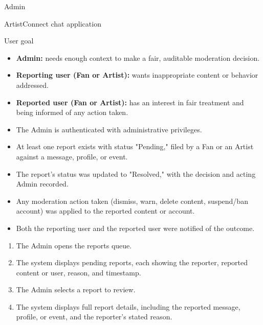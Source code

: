 \documentclass[11pt]{report}
\begin{document}
\begin{description}[leftmargin=2.2cm, style=nextline]
  \item[Primary Actor] Admin
  \item[Scope] ArtistConnect chat application
  \item[Level] User goal
  \item[Stakeholders \& Interests]
    \begin{itemize}
      \item \textbf{Admin:} needs enough context to make a fair, auditable moderation decision.
      \item \textbf{Reporting user (Fan or Artist):} wants inappropriate content or behavior addressed.
      \item \textbf{Reported user (Fan or Artist):} has an interest in fair treatment and being informed of any action taken.
    \end{itemize}
  \item[Preconditions]
    \begin{itemize}
      \item The Admin is authenticated with administrative privileges.
      \item At least one report exists with status "Pending," filed by a Fan or an Artist against a message, profile, or event.
    \end{itemize}
  \item[Postconditions (Success Guarantee)]
    \begin{itemize}
      \item The report's status was updated to "Resolved," with the decision and acting Admin recorded.
      \item Any moderation action taken (dismiss, warn, delete content, suspend/ban account) was applied to the reported content or account.
      \item Both the reporting user and the reported user were notified of the outcome.
    \end{itemize}
  \item[Main Success Scenario]
    \begin{enumerate}
      \item The Admin opens the reports queue.
      \item The system displays pending reports, each showing the reporter, reported content or user, reason, and timestamp.
      \item The Admin selects a report to review.
      \item The system displays full report details, including the reported message, profile, or event, and the reporter's stated reason.

\end{enumerate}
\end{description}
\end{document}
